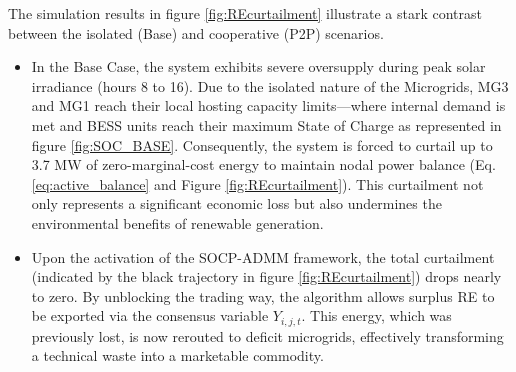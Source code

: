 \documentclass[preprint,12pt]{elsarticle}
\begin{document}
    The simulation results in figure \ref{fig:REcurtailment} illustrate a stark contrast between the isolated (Base) and cooperative (P2P) scenarios.
    \begin{itemize}
        \item In the Base Case, the system exhibits severe oversupply during peak solar irradiance (hours 8 to 16). Due to the isolated nature of the Microgrids, MG3 and MG1 reach their local hosting capacity limits—where internal demand is met and BESS units reach their maximum State of Charge as represented in figure \ref{fig:SOC_BASE}. Consequently, the system is forced to curtail up to 3.7 MW of zero-marginal-cost energy to maintain nodal power balance (Eq. \eqref{eq:active_balance} and Figure \ref{fig:REcurtailment}). This curtailment not only represents a significant economic loss but also undermines the environmental benefits of renewable generation.
        \item Upon the activation of the SOCP-ADMM framework, the total curtailment (indicated by the black trajectory in figure \ref{fig:REcurtailment}) drops nearly to zero. By unblocking the trading way, the algorithm allows surplus RE to be exported via the consensus variable $Y_{i,j,t}$. This energy, which was previously lost, is now rerouted to deficit microgrids, effectively transforming a technical waste into a marketable commodity.
    \end{itemize}
\end{document}

